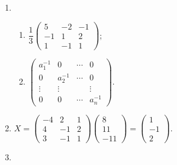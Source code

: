 \documentclass[a4paper, 11pt]{ctexart}
\begin{document}
\begin{enumerate}
    \item %
        \begin{enumerate}[(1)]
            \item %
                $
                    \dfrac13
                    \left(
                        \begin{array}{ccc}
                            5 & -2 & -1 \\
                            -1 & 1 & 2 \\
                            1 & -1 & 1
                        \end{array}
                    \right)
                $;
            \item %
                $
                    \left(
                        \begin{array}{cccc}
                            a_1^{-1} & 0 & \cdots & 0 \\
                            0 & a_2^{-1} & \cdots & 0 \\
                            \vdots & \vdots &  & \vdots \\
                            0 & 0 & \cdots & a_n^{-1}
                        \end{array}
                    \right)
                $.
        \end{enumerate}
    \item %
        $
            X =
            \left(
                \begin{array}{ccc}
                    -4 & 2 & 1 \\
                    4 & -1 & 2 \\
                    3 & -1 & 1
                \end{array}
            \right)
            \left(
                \begin{array}{c}
                    8 \\
                    11 \\
                    -11
                \end{array}
            \right)
            =
            \left(
                \begin{array}{c}
                    1 \\
                    -1 \\
                    2
                \end{array}
            \right)
        $.
    \item %

\end{enumerate}
\end{document}
